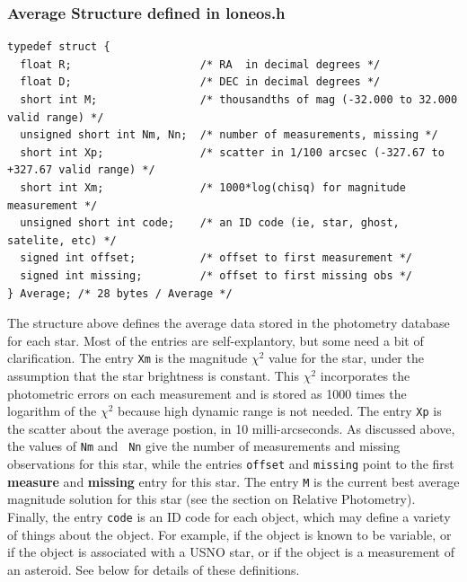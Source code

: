 \documentclass{article}
\begin{document}
\subsubsection*{Average Structure defined in loneos.h}
\begin{verbatim}
typedef struct {
  float R;                    /* RA  in decimal degrees */
  float D;                    /* DEC in decimal degrees */
  short int M;                /* thousandths of mag (-32.000 to 32.000 valid range) */
  unsigned short int Nm, Nn;  /* number of measurements, missing */
  short int Xp;               /* scatter in 1/100 arcsec (-327.67 to +327.67 valid range) */
  short int Xm;               /* 1000*log(chisq) for magnitude measurement */
  unsigned short int code;    /* an ID code (ie, star, ghost, satelite, etc) */
  signed int offset;          /* offset to first measurement */
  signed int missing;         /* offset to first missing obs */
} Average; /* 28 bytes / Average */
\end{verbatim}
The structure above defines the average data stored in the photometry
database for each star.  Most of the entries are self-explantory, but
some need a bit of clarification.  The entry {\tt Xm} is the magnitude
$\chi^2$ value for the star, under the assumption that the star
brightness is constant.  This $\chi^2$ incorporates the photometric
errors on each measurement and is stored as 1000 times the logarithm
of the $\chi^2$ because high dynamic range is not needed.  The entry
{\tt Xp} is the scatter about the average postion, in 10
milli-arcseconds.  As discussed above, the values of {\tt Nm} and {\tt
  Nn} give the number of measurements and missing observations for
this star, while the entries {\tt offset} and {\tt missing} point to
the first {\bf measure} and {\bf missing} entry for this star.  The
entry {\tt M} is the current best average magnitude solution for this
star (see the section on Relative Photometry).  Finally, the entry
{\tt code} is an ID code for each object, which may define a variety
of things about the object.  For example, if the object is known to be
variable, or if the object is associated with a USNO star, or if the
object is a measurement of an asteroid.  See below for details of
these definitions.
\end{document}
